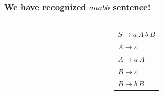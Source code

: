 \documentclass[11pt]{beamer}
\begin{document}
\begin{frame}[noframenumbering]
\frametitle{We have recognized $aaabb$ sentence!}
\begin{columns}
	\begin{column}{0.7\textwidth}
		\begin{center}
		\end{center}
	\end{column}
	\begin{column}{0.3\textwidth}
		\begin{tabular}{l} $S \rightarrow a\ A\ b\ B$ \\ 
											 $A \rightarrow \varepsilon$ \\
											 $A \rightarrow a\ A$ \\
											 $B \rightarrow \varepsilon$ \\
											 $B \rightarrow b\ B$ \\
		\end{tabular}
	\end{column}
\end{columns}
\end{frame}
\end{document}
